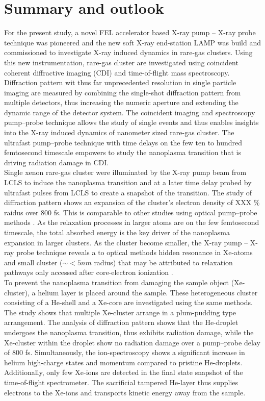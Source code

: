 \chapter{Summary and outlook}\label{ch:summary_outlook}
For the present study, a novel FEL accelerator based X-ray pump -- X-ray probe technique was pioneered and the new soft X-ray end-station LAMP was build and commissioned to investigate X-ray induced dynamics in rare-gas clusters. Using this new instrumentation, rare-gas cluster are investigated using coincident coherent diffractive imaging (CDI) and time-of-flight mass spectroscopy. Diffraction pattern wit thus far unprecedented resolution in single particle imaging are measured by combining the single-shot diffraction pattern from multiple detectors, thus increasing the numeric aperture and extending the dynamic range of the detector system. The coincident imaging and spectroscopy pump--probe technique allows the study of single events and thus enables insights into the X-ray induced dynamics of nanometer sized rare-gas cluster. The ultrafast pump--probe technique with time delays on the few ten to hundred femtosecond timescale empowers to study the nanoplasma transition that is driving radiation damage in CDI.\\
Single xenon rare-gas cluster were illuminated by the X-ray pump beam from LCLS to induce the nanoplasma transition and at a later time delay probed by ultrafast pulses from LCLS to create a snapshot of the transition. The study of diffraction pattern shows an expansion of the cluster's electron density of XXX \% raidus over 800 fs. This is comparable to other studies using optical pump--probe methods \citep{Gorkhover-2016-NatPho}. As the relaxation processes in larger atoms are on the few femtosecond timescale, the total absorbed energy is the key driver of the nanoplasma expansion in larger clusters. As the cluster become smaller, the X-ray pump -- X-ray probe technique reveals a to optical methods hidden resonance in Xe-atoms and small cluster ($\sim <5 nm$ radius) that may be attributed to relaxation pathways only accessed after core-electron ionization \citep{Ho-2014-PRL}.\\
To prevent the nanoplasma transition from damaging the sample object (Xe-cluster), a helium layer is placed around the sample. These heterogeneous cluster consisting of a He-shell and a Xe-core are investigated using the same methods. The study shows that multiple Xe-cluster arrange in a plum-pudding type arrangement. The analysis of diffraction pattern shows that the He-droplet undergoes the nanoplasma transition, thus exhibits radiation damage, while the Xe-cluster within the droplet show no radiation damage over a pump--probe delay of 800 fs. Simultaneously, the ion-spectroscopy shows a significant increase in helium high-charge states and momentum compared to pristine He-droplets. Additionally, only few Xe-ions are detected in the final state snapshot of the time-of-flight spectrometer. The sacrificial tampered He-layer thus supplies electrons to the Xe-ions and transports kinetic energy away from the sample.\\
